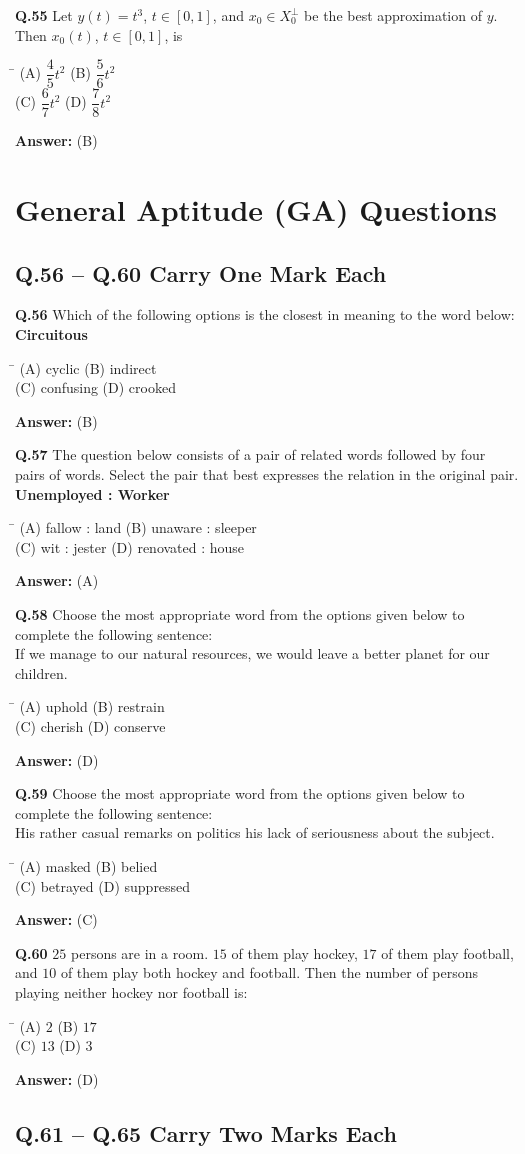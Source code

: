 \documentclass[11pt,a4paper]{article}
\newcommand{\optsfourA}[4]{%
  \begin{tabbing}
    \hspace{0.48\linewidth}\=\kill
    (A) #1 \> (B) #2 \\[2pt]
    (C) #3 \> (D) #4
  \end{tabbing}%
}
\newcommand{\ans}[1]{\textbf{Answer:} #1\par\medskip}
\begin{document}
\textbf{Q.55} Let $y(t) = t^3$, $t \in [0, 1]$, and $x_0 \in X_0^\perp$ be the best approximation of $y$. Then $x_0(t)$, $t \in [0, 1]$, is
\optsfourA{$\dfrac{4}{5}t^2$}{$\dfrac{5}{6}t^2$}{$\dfrac{6}{7}t^2$}{$\dfrac{7}{8}t^2$}
\ans{(B)}

\section*{General Aptitude (GA) Questions}

\subsection*{Q.56 -- Q.60 Carry One Mark Each}

\textbf{Q.56} Which of the following options is the closest in meaning to the word below:\\
\textbf{Circuitous}
\optsfourA{cyclic}{indirect}{confusing}{crooked}
\ans{(B)}

\textbf{Q.57} The question below consists of a pair of related words followed by four pairs of words. Select the pair that best expresses the relation in the original pair.\\
\textbf{Unemployed : Worker}
\optsfourA{fallow : land}{unaware : sleeper}{wit : jester}{renovated : house}
\ans{(A)}

\textbf{Q.58} Choose the most appropriate word from the options given below to complete the following sentence:\\
If we manage to \underline{\hspace{2cm}} our natural resources, we would leave a better planet for our children.
\optsfourA{uphold}{restrain}{cherish}{conserve}
\ans{(D)}

\textbf{Q.59} Choose the most appropriate word from the options given below to complete the following sentence:\\
His rather casual remarks on politics \underline{\hspace{2cm}} his lack of seriousness about the subject.
\optsfourA{masked}{belied}{betrayed}{suppressed}
\ans{(C)}

\textbf{Q.60} $25$ persons are in a room. $15$ of them play hockey, $17$ of them play football, and $10$ of them play both hockey and football. Then the number of persons playing neither hockey nor football is:
\optsfourA{$2$}{$17$}{$13$}{$3$}
\ans{(D)}

\subsection*{Q.61 -- Q.65 Carry Two Marks Each}
\end{document}
